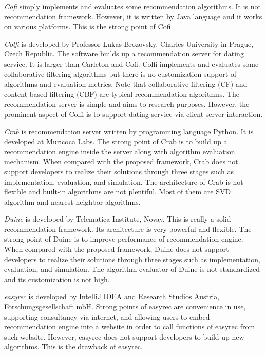 \documentclass[a4paper]{llncs}
\begin{document}
\textit{Cofi} \cite{cofi} simply implements and evaluates some recommendation algorithms. It is not recommendation framework. However, it is written by Java language \cite{oracle2014java} and it works on various platforms. This is the strong point of Cofi.

\textit{Colfi} \cite{colfi} is developed by Professor Lukas Brozovsky, Charles University in Prague, Czech Republic. The software builds up a recommendation server for dating service. It is larger than Carleton and Cofi. Colfi implements and evaluates some collaborative filtering algorithms but there is no customization support of algorithms and evaluation metrics. Note that collaborative filtering (CF) and content-based filtering (CBF) are typical recommendation algorithms. The recommendation server is simple and aims to research purposes. However, the prominent aspect of Colfi is to support dating service via client-server interaction.

\textit{Crab} \cite{crab} is recommendation server written by programming language Python. It is developed at Muricoca Labs. The strong point of Crab is to build up a recommendation engine inside the server along with algorithm evaluation mechanism. When compared with the proposed framework, Crab does not support developers to realize their solutions through three stages such as implementation, evaluation, and simulation. The architecture of Crab is not flexible and built-in algorithms are not plentiful. Most of them are SVD algorithm and nearest-neighbor algorithms.

\textit{Duine} \cite{duine} is developed by Telematica Institute, Novay. This is really a solid recommendation framework. Its architecture is very powerful and flexible. The strong point of Duine is to improve performance of recommendation engine. When compared with the proposed framework, Duine does not support developers to realize their solutions through three stages such as implementation, evaluation, and simulation. The algorithm evaluator of Duine is not standardized and its customization is not high.

\textit{easyrec} \cite{easyrec} is developed by IntelliJ IDEA and Research Studios Austria, Forschungsgesellschaft mbH. Strong points of easyrec are convenience in use, supporting consultancy via internet, and allowing users to embed recommendation engine into a website in order to call functions of easyrec from such website. However, easyrec does not support developers to build up new algorithms. This is the drawback of easyrec.
\end{document}
